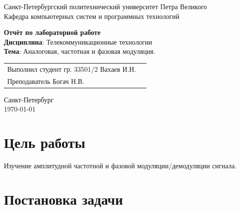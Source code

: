 \documentclass[a4paper,14pt]{extarticle}
\begin{document}
\begin{titlepage}
\centering
Санкт-Петербургский политехнический университет Петра Великого \\
\vspace{0.15cm}
Кафедра компьютерных систем и программных технологий \\
\vspace{6.5cm}

{\centering \textbf{Отчёт по лабораторной работе} \\ 
\vspace{0.15cm}
\textbf{Дисциплина}: Телекоммуникационные технологии \\
\vspace{0.15cm}
\textbf{Тема}: Аналоговая, частотная и фазовая модуляция.} \\


\vspace{6.5cm}

\begin{table}[H]
\begin{tabular}{p{\textwidth}@{}r}
{Выполнил студент гр. 33501/2} \hfill {Вахаев И.Н.} \\
{Преподаватель} \hfill {Богач Н.В.} \\
\end{tabular}
\end{table}
\vfill

{\centering Санкт-Петербург \\ 
\vspace{0.15cm}
\today}
\end{titlepage}

\tableofcontents

\newpage

\section{Цель работы}

Изучение амплитудной частотной и фазовой модуляции/демодуляции сигнала.

\section{Постановка задачи}
\end{document}
